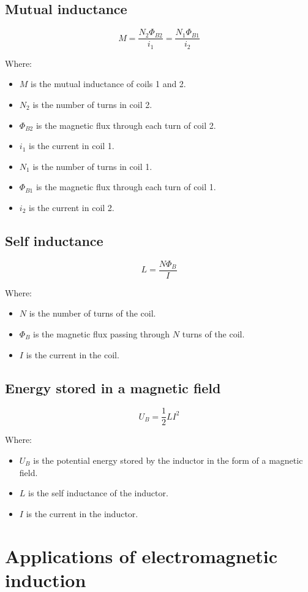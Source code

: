 \documentclass[11pt]{article}
\begin{document}
\subsection{Mutual inductance}
\label{sec:org88c1307}
\[M = \frac{N_2 \Phi_{B2}}{i_1} = \frac{N_1 \Phi_{B1}}{i_2}\]

Where:
\begin{itemize}
\item \(M\) is the mutual inductance of coils 1 and 2.
\item \(N_2\) is the number of turns in coil 2.
\item \(\Phi_{B2}\) is the magnetic flux through each turn of coil 2.
\item \(i_1\) is the current in coil 1.
\item \(N_1\) is the number of turns in coil 1.
\item \(\Phi_{B1}\) is the magnetic flux through each turn of coil 1.
\item \(i_2\) is the current in coil 2.
\end{itemize}
\subsection{Self inductance}
\label{sec:org82323eb}
\[L = \frac{N \Phi_B}{I}\]

Where:
\begin{itemize}
\item \(N\) is the number of turns of the coil.
\item \(\Phi_B\) is the magnetic flux passing through \(N\) turns of the coil.
\item \(I\) is the current in the coil.
\end{itemize}
\subsection{Energy stored in a magnetic field}
\label{sec:org3cc26a1}
\[U_B = \frac{1}{2} L I^2\]

Where:
\begin{itemize}
\item \(U_B\) is the potential energy stored by the inductor in the form of a magnetic field.
\item \(L\) is the self inductance of the inductor.
\item \(I\) is the current in the inductor.
\end{itemize}

\newpage
\section{Applications of electromagnetic induction}
\label{sec:org2ee3fab}
\end{document}
